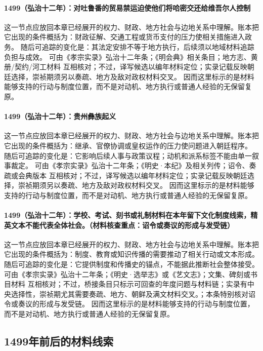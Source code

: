\paragraph{1499（弘治十二年）：对吐鲁番的贸易禁运迫使他们将哈密交还给维吾尔人控制} 这一节点应放回本章已经展开的权力、财政、地方社会与边地关系中理解。账本把它出现的条件概括为：财政征解、交通工程或货币支付的压力使相关措施进入政务。 随后可追踪的变化是：其法定安排不等于地方执行，后续须以地域材料追踪负担与成效。 可由《孝宗实录》弘治十二年条；《明会典》相关条目；地方志、黄册/契约/河工材料 互相核对；不过，译写候选以编年材料定位；实录记载反映朝廷选择，崇祯期须另以奏疏、地方及敌对政权材料交叉。 因而这里标示的是材料能够支持的行动与制度位置，而不是对动机、地方执行或普通人经验的无保留复原。

\paragraph{1499（弘治十二年）：贵州彝族起义} 这一节点应放回本章已经展开的权力、财政、地方社会与边地关系中理解。账本把它出现的条件概括为：继承、官僚协调或皇权运作的压力使问题进入朝廷程序。 随后可追踪的变化是：它影响后续人事与政策议程；动机和派系标签不能由单一叙事裁定。 可由《孝宗实录》弘治十二年条；《明史·本纪》及相关列传；诏令、奏疏或会典版本 互相核对；不过，译写候选以编年材料定位；实录记载反映朝廷选择，崇祯期须另以奏疏、地方及敌对政权材料交叉。 因而这里标示的是材料能够支持的行动与制度位置，而不是对动机、地方执行或普通人经验的无保留复原。

\paragraph{1499（弘治十二年）：学校、考试、刻书或礼制材料在本年留下文化制度线索，精英文本不能代表全体社会。（材料核查重点：诏令或奏议的形成与发受链）} 这一节点应放回本章已经展开的权力、财政、地方社会与边地关系中理解。账本把它出现的条件概括为：制度、教育或知识传播的需要推动了相关行动或文本形成。 随后可追踪的变化是：它提供制度和传播史的锚点，不能据此推断社会整体接受。 可由《孝宗实录》弘治十二年条；《明史·选举志》或《艺文志》；文集、碑刻或书目材料 互相核对；不过，桥接条目只标示可回查的年度问题与材料链；实录有中央选择性，崇祯期尤其需要奏疏、地方、朝鲜及满文材料交叉。；本条特别核对诏令或奏议的形成与发受链。 因而这里标示的是材料能够支持的行动与制度位置，而不是对动机、地方执行或普通人经验的无保留复原。

\subsection{1499年前后的材料线索}

